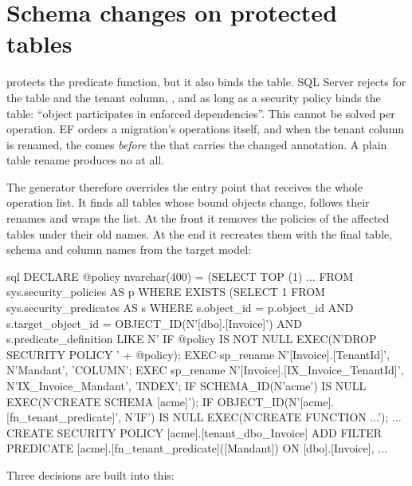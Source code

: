 \section{Schema changes on protected tables}\label{sec:sqlserver-schema-bound-changes}

 protects the predicate function, but it also binds the table. SQL Server
rejects  for the table and the tenant column, ,  and 
as long as a security policy binds the table: “object participates in enforced dependencies”.
This cannot be solved per operation. EF orders a migration's operations itself, and when the
tenant column is renamed, the  comes
\emph{before} the  that carries the changed
annotation. A plain table rename produces no 
at all.

The generator therefore overrides the entry point that receives the whole operation list. It
finds all tables whose bound objects change, follows their renames and wraps the list. At the
front it removes the policies of the affected tables under their old names. At the end it
recreates them with the final table, schema and column names from the target model:

\begin{sourcecode}{sql}
DECLARE @policy nvarchar(400) = (SELECT TOP (1) ... FROM sys.security_policies AS p
    WHERE EXISTS (SELECT 1 FROM sys.security_predicates AS s WHERE s.object_id = p.object_id
        AND s.target_object_id = OBJECT_ID(N'[dbo].[Invoice]')
        AND s.predicate_definition LIKE N'%
IF @policy IS NOT NULL EXEC(N'DROP SECURITY POLICY ' + @policy);
EXEC sp_rename N'[Invoice].[TenantId]', N'Mandant', 'COLUMN';
EXEC sp_rename N'[Invoice].[IX_Invoice_TenantId]', N'IX_Invoice_Mandant', 'INDEX';
IF SCHEMA_ID(N'acme') IS NULL EXEC(N'CREATE SCHEMA [acme]');
IF OBJECT_ID(N'[acme].[fn_tenant_predicate]', N'IF') IS NULL EXEC(N'CREATE FUNCTION ...');
...
CREATE SECURITY POLICY [acme].[tenant_dbo_Invoice]
    ADD FILTER PREDICATE [acme].[fn_tenant_predicate]([Mandant]) ON [dbo].[Invoice], ...
\end{sourcecode}

Three decisions are built into this:

